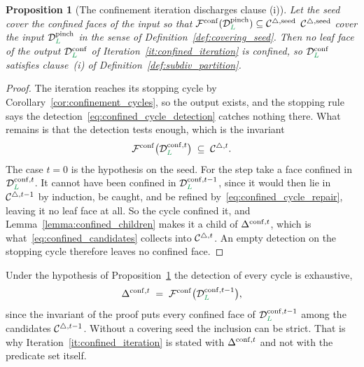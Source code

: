 \documentclass[a4paper, 12pt]{article}
\makeatletter
\newcommand{\robert}[1]{{\color{orange} #1}}
\DeclareRobustCommand{\candF}[1][]{\mathcal{C}^{\triangle\ifx\@empty#1\@empty\else,#1\fi}}
\newcommand{\green}{\color{ForestGreen}}
\newcommand{\F}{\mathcal{F}}
\DeclareRobustCommand{\simplexsubsetTwo}[2][]{\Delta\ifx\@empty#1\@empty\else^{#1}\fi_{#2}}
\renewcommand{\L}{{\green L}}
\newtheorem{proposition}[theorem]{Proposition}
\theoremstyle{definition}
\theoremstyle{plain}
\numberwithin{equation}{section}
\newcommand{\tobecut}[1]{{\color{red} #1}}     %
\DeclareRobustCommand{\domseq}[1][]{\mathcal{D}\ifx\@empty#1\@empty\else_{#1}\fi}
\makeatother
\begin{document}
\begin{proposition}[The confinement iteration discharges clause (i)]
    \label{prop:confined_discharged}
    Let the seed \tobecut{cover the confined faces of the input so that $\F^{\mathrm{conf}}(\domseq[\L]^{\mathrm{pinch}}) \subseteq \candF[\mathrm{seed}]$}\robert{$\candF[\mathrm{seed}]$ cover the input $\domseq[\L]^{\mathrm{pinch}}$ in the sense of Definition~\ref{def:covering_seed}}. Then no leaf face of the output $\domseq[\L]^{\mathrm{conf}}$ of Iteration~\ref{it:confined_iteration} is confined, so $\domseq[\L]^{\mathrm{conf}}$ satisfies clause~(i) of Definition~\ref{def:subdiv_partition}.
\end{proposition}
\begin{proof}
    The iteration reaches its stopping cycle by Corollary~\ref{cor:confinement_cycles}, so the output exists, and the stopping rule says the detection~\eqref{eq:confined_cycle_detection} catches nothing there. What remains is that the detection tests enough, which is the invariant
    \begin{equation*}
        \F^{\mathrm{conf}} \big( \domseq[\L]^{\mathrm{conf},t} \big) \; \subseteq \; \candF[t] .
    \end{equation*}
    The case $t = 0$ is the hypothesis on the seed. For the step take a face confined in $\domseq[\L]^{\mathrm{conf},t}$. It cannot have been confined in $\domseq[\L]^{\mathrm{conf},t-1}$, since it would then lie in $\candF[t-1]$ by induction, be caught, and be refined by~\eqref{eq:confined_cycle_repair}, leaving it no leaf face at all. So the cycle confined it, and Lemma~\ref{lemma:confined_children} makes it a child of $\simplexsubsetTwo[\mathrm{conf},t]{}$, which is what~\eqref{eq:confined_candidates} collects into $\candF[t]$. An empty detection on the stopping cycle therefore leaves no confined face.
\end{proof}

Under the hypothesis of Proposition~\ref{prop:confined_discharged} the detection of every cycle is exhaustive,
\begin{equation}
    \label{eq:confined_detection_exhaustive}
    \simplexsubsetTwo[\mathrm{conf},t]{} \; = \; \F^{\mathrm{conf}} \big( \domseq[\L]^{\mathrm{conf},t-1} \big) ,
\end{equation}
since the invariant of the proof puts every confined face of $\domseq[\L]^{\mathrm{conf},t-1}$ among the candidates $\candF[t-1]$. Without a covering seed the inclusion can be strict. That is why Iteration~\ref{it:confined_iteration} is stated with $\simplexsubsetTwo[\mathrm{conf},t]{}$ and not with the predicate set itself.
\end{document}
